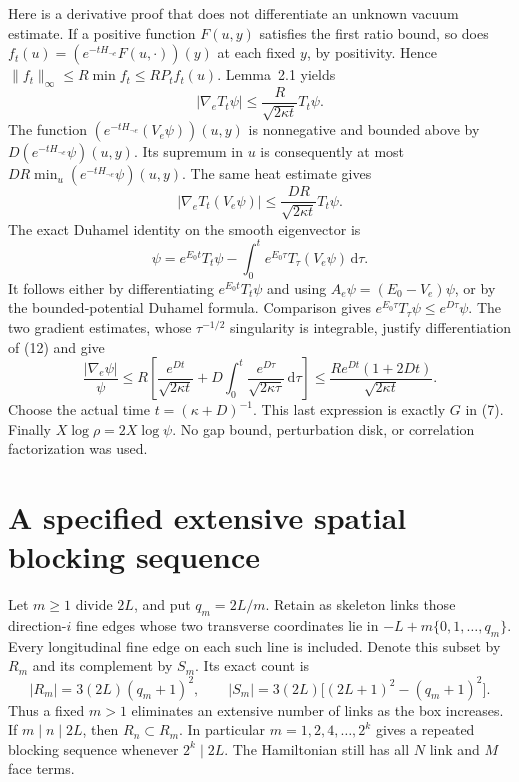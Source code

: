 \documentclass[11pt]{article}
\newcommand{\dd}{\,\mathrm d}
\begin{document}
Here is a derivative proof that does not differentiate an unknown
vacuum estimate. If a positive function $F(u,y)$ satisfies the first
ratio bound, so does
$f_t(u)=(e^{-tH_{\neg e}}F(u,\cdot))(y)$ at each fixed $y$, by
positivity. Hence $\|f_t\|_\infty\leq R\min f_t\leq RP_t f_t(u)$.
Lemma~2.1 yields
\[
 |\nabla_e T_t\psi|\leq\frac{R}{\sqrt{2\kappa t}}T_t\psi.
\]
The function $(e^{-tH_{\neg e}}(V_e\psi))(u,y)$ is nonnegative and
bounded above by $D(e^{-tH_{\neg e}}\psi)(u,y)$. Its supremum in $u$
is consequently at most $DR\min_u(e^{-tH_{\neg e}}\psi)(u,y)$.
The same heat estimate gives
\[
 |\nabla_e T_t(V_e\psi)|\leq\frac{DR}{\sqrt{2\kappa t}}T_t\psi.
\]
The exact Duhamel identity on the smooth eigenvector is
\begin{equation}\label{eq:duhamel}
 \psi=e^{E_0t}T_t\psi-\int_0^t e^{E_0\tau}T_\tau(V_e\psi)\dd\tau.
\end{equation}
It follows either by differentiating $e^{E_0t}T_t\psi$ and using
$A_e\psi=(E_0-V_e)\psi$, or by the bounded-potential Duhamel formula.
Comparison gives $e^{E_0\tau}T_\tau\psi\leq e^{D\tau}\psi$.
The two gradient estimates, whose $\tau^{-1/2}$ singularity is
integrable, justify differentiation of (12) and give
\[
 \frac{|\nabla_e\psi|}{\psi}
 \leq R\left[\frac{e^{Dt}}{\sqrt{2\kappa t}}
       +D\int_0^t\frac{e^{D\tau}}{\sqrt{2\kappa\tau}}\dd\tau\right]
 \leq\frac{Re^{Dt}(1+2Dt)}{\sqrt{2\kappa t}}.
\]
Choose the actual time $t=(\kappa+D)^{-1}$. This last expression is
exactly $G$ in (7). Finally $X\log\rho=2X\log\psi$.
No gap bound, perturbation disk, or correlation factorization was used.



\section{A specified extensive spatial blocking sequence}

Let $m\geq1$ divide $2L$, and put $q_m=2L/m$. Retain as skeleton links
those direction-$i$ fine edges whose two transverse coordinates lie in
$-L+m\{0,1,\ldots,q_m\}$. Every longitudinal fine edge on each such
line is included. Denote this subset by $R_m$ and its complement by $S_m$.
Its exact count is
\begin{equation}\label{eq:counts}
 |R_m|=3(2L)(q_m+1)^2,\qquad
 |S_m|=3(2L)\bigl[(2L+1)^2-(q_m+1)^2\bigr].
\end{equation}
Thus a fixed $m>1$ eliminates an extensive number of links as the box
increases. If $m\mid n\mid2L$, then $R_n\subset R_m$. In particular
$m=1,2,4,\ldots,2^k$ gives a repeated blocking sequence whenever $2^k\mid2L$.
The Hamiltonian still has all $N$ link and $M$ face terms.
\end{document}
